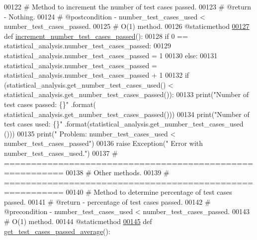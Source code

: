 \begin{DoxyCode}
00122     \textcolor{comment}{#   Method to increment the number of test cases passed.}
00123     \textcolor{comment}{#   @return - Nothing.}
00124     \textcolor{comment}{#   @postcondition - number\_test\_cases\_used < number\_test\_cases\_passed.}
00125     \textcolor{comment}{#   O(1) method.}
00126     @staticmethod
\hypertarget{test__statistics_8py_source_l00127}{}\hyperlink{classstatistics_1_1test__statistics_1_1statistical__analysis_a056f55c0e7f60e29d4b37e8e74d3cd08}{00127}     \textcolor{keyword}{def }\hyperlink{classstatistics_1_1test__statistics_1_1statistical__analysis_a056f55c0e7f60e29d4b37e8e74d3cd08}{increment\_number\_test\_cases\_passed}():
00128         \textcolor{keywordflow}{if} 0 == statistical\_analysis.number\_test\_cases\_passed:
00129             statistical\_analysis.number\_test\_cases\_passed = 1
00130         \textcolor{keywordflow}{else}:
00131             statistical\_analysis.number\_test\_cases\_passed = statistical\_analysis.number\_test\_cases\_passed +
       1
00132         \textcolor{keywordflow}{if} (statistical\_analysis.get\_number\_test\_cases\_used() < 
      statistical\_analysis.get\_number\_test\_cases\_passed()):
00133             print(\textcolor{stringliteral}{"Number of test cases passed: \{\}"} .format(
      statistical\_analysis.get\_number\_test\_cases\_passed()))
00134             print(\textcolor{stringliteral}{"Number of test cases used:   \{\}"} .format(statistical\_analysis.get\_number\_test\_cases\_used
      ()))
00135             print(\textcolor{stringliteral}{" Problem: number\_test\_cases\_used < number\_test\_cases\_passed"})
00136             \textcolor{keywordflow}{raise} Exception(\textcolor{stringliteral}{"   Error with number\_test\_cases\_used."})
00137     \textcolor{comment}{# =========================================================}
00138     \textcolor{comment}{#   Other methods.}
00139     \textcolor{comment}{# =========================================================}
00140     \textcolor{comment}{#   Method to determine percentage of test cases passed.}
00141     \textcolor{comment}{#   @return - percentage of test cases passed.}
00142     \textcolor{comment}{#   @precondition - number\_test\_cases\_used < number\_test\_cases\_passed.}
00143     \textcolor{comment}{#   O(1) method.}
00144     @staticmethod
\hypertarget{test__statistics_8py_source_l00145}{}\hyperlink{classstatistics_1_1test__statistics_1_1statistical__analysis_a1bec04d2404b2bdf277c4ba170abb4a1}{00145}     \textcolor{keyword}{def }\hyperlink{classstatistics_1_1test__statistics_1_1statistical__analysis_a1bec04d2404b2bdf277c4ba170abb4a1}{get\_test\_cases\_passed\_average}():

\end{DoxyCode}
